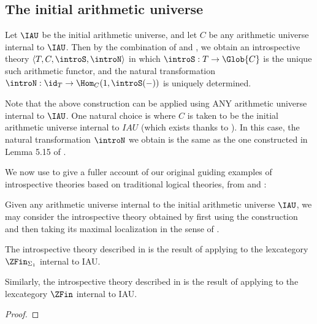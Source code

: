 
\subsection{The initial arithmetic universe}
\begin{construction}\label{IAUAsIntrospGeneral}
Let $\IAU$ be the initial arithmetic universe, and let $C$ be any arithmetic universe internal to $\IAU$. Then by the combination of  and , we obtain an introspective theory $\langle T, C, \introS, \introN \rangle$ in which $\introS : T \to \Glob{C}$ is the unique such arithmetic functor, and the natural transformation $\introN : \id_T \to \Hom_C(1, \introS(-))$ is uniquely determined.
\end{construction}

\begin{observation}
Note that the above construction can be applied using ANY arithmetic universe internal to $\IAU$. One natural choice is where $C$ is taken to be the initial arithmetic universe internal to $IAU$ (which exists thanks to ). In this case, the natural transformation $\introN$ we obtain is the same as the one constructed in Lemma 5.15 of \autocite{van2020g}.
\end{observation}

We now use  to give a fuller account of our original guiding examples of introspective theories based on traditional logical theories, from  and :

\begin{construction}\label{MaxLocalizeIAUGeneral}
Given any arithmetic universe internal to the initial arithmetic universe $\IAU$, we may consider the introspective theory obtained by first using the construction  and then taking its maximal localization in the sense of .
\end{construction}

\begin{theorem}
The introspective theory described in  is the result of applying  to the lexcategory $\ZFin_{\Sigma_1}$ internal to IAU.

Similarly, the introspective theory described in  is the result of applying  to the lexcategory $\ZFin$ internal to IAU.
\end{theorem}
\begin{proof}
\TODO
\end{proof}

